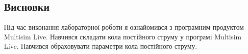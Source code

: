 \documentclass{article}
\begin{document}
\begin{normalsize}
	\section*{Висновки}
Під час виконання лабораторної роботи я ознайомився з програмним продуктом
	Multisim Live. Навчився складати кола постійного струму у програмі Multisim
	Live. Навчився обраховувати параметри кола постійного струму.
	    
\end{normalsize}
\end{document}
